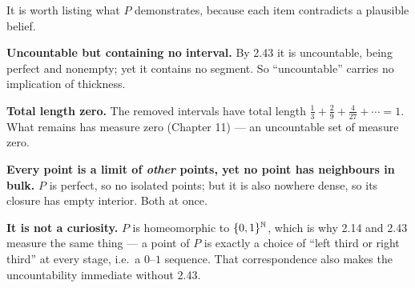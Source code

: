 \begin{deeper}
It is worth listing what $P$ demonstrates, because each item contradicts a
plausible belief.

\smallskip
\textbf{Uncountable but containing no interval.} By 2.43 it is uncountable,
being perfect and nonempty; yet it contains no segment. So ``uncountable''
carries no implication of thickness.

\smallskip
\textbf{Total length zero.} The removed intervals have total length
$\frac13 + \frac29 + \frac{4}{27} + \cdots = 1$. What remains has measure zero
(Chapter 11) --- an uncountable set of measure zero.

\smallskip
\textbf{Every point is a limit of \emph{other} points, yet no point has
neighbours in bulk.} $P$ is perfect, so no isolated points; but it is also
nowhere dense, so its closure has empty interior. Both at once.

\smallskip
\textbf{It is not a curiosity.} $P$ is homeomorphic to $\{0,1\}^{\mathbb{N}}$, which is
why 2.14 and 2.43 measure the same thing --- a point of $P$ is exactly a choice
of ``left third or right third'' at every stage, i.e.\ a $0$--$1$ sequence.
That correspondence also makes the uncountability immediate without 2.43.

\medskip
\begin{center}
\end{center}
\end{deeper}

